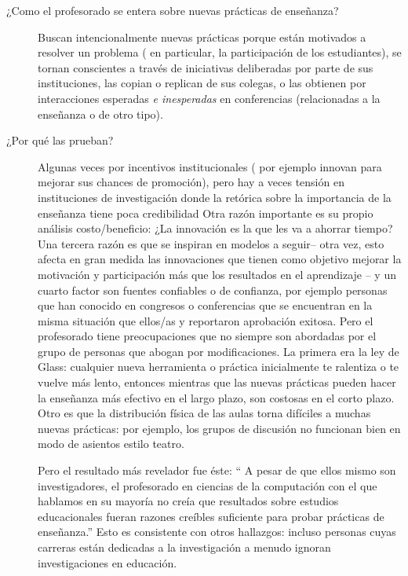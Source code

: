 \begin{description}

\item[¿Como el profesorado se entera sobre nuevas prácticas de enseñanza?]

Buscan intencionalmente nuevas prácticas
porque están motivados a resolver un problema ( en particular, la participación de los estudiantes),
se tornan conscientes a través de iniciativas deliberadas por parte de sus instituciones,
las copian o replican de sus colegas,
o las obtienen por interacciones esperadas  \emph{e inesperadas} en conferencias
(relacionadas a la enseñanza o de otro tipo).

\item[¿Por qué las prueban?]

Algunas veces por incentivos institucionales
( por ejemplo innovan para mejorar sus chances de promoción),
pero hay a veces tensión en instituciones de investigación
donde la retórica sobre la importancia de la enseñanza tiene poca credibilidad
Otra razón importante es su propio análisis costo/beneficio:
¿La innovación es la que les va a ahorrar tiempo?
Una tercera razón es que se inspiran en modelos a seguir-- otra vez,
esto afecta en gran medida las innovaciones que tienen como objetivo mejorar la motivación y participación más que los resultados en el aprendizaje
-- y un cuarto factor son fuentes confiables o de confianza,
por ejemplo personas que han  conocido en congresos o conferencias que se encuentran en la misma situación que ellos/as 
y reportaron aprobación exitosa.
Pero el profesorado tiene preocupaciones que no siempre son abordadas por el grupo de personas que abogan por modificaciones.
La primera era la ley de Glass:
cualquier nueva herramienta o práctica inicialmente te ralentiza o  te vuelve más lento,
entonces mientras que las nuevas prácticas pueden hacer la enseñanza más efectivo en el largo plazo, son costosas en el corto plazo.
Otro es que la distribución física de las aulas torna difíciles a muchas nuevas prácticas:
por ejemplo,
los grupos de discusión no funcionan bien en modo de asientos estilo teatro.

Pero el resultado más revelador fue éste:
`` A pesar de que ellos mismo son investigadores,
el profesorado en ciencias de la computación con el que hablamos en su mayoría no creía
que resultados sobre estudios educacionales fueran razones creíbles suficiente para probar prácticas de enseñanza.”
Esto es consistente con otros hallazgos:
incluso personas cuyas carreras están dedicadas  a la investigación a menudo ignoran investigaciones en educación. 



\end{description}
